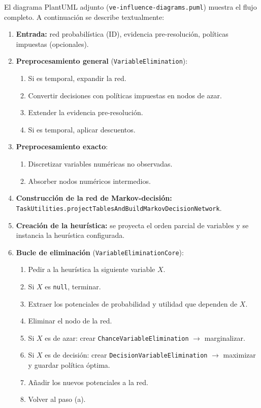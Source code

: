 \documentclass[11pt,a4paper]{article}
\newcommand{\clase}[1]{\texttt{#1}}
\begin{document}
El diagrama PlantUML adjunto (\texttt{ve-influence-diagrams.puml}) muestra
el flujo completo. A continuaci\'{o}n se describe textualmente:

\begin{enumerate}
  \item \textbf{Entrada:} red probabil\'{i}stica (ID), evidencia pre-resoluci\'{o}n,
        pol\'{i}ticas impuestas (opcionales).

  \item \textbf{Preprocesamiento general} (\clase{VariableElimination}):
    \begin{enumerate}
      \item Si es temporal, expandir la red.
      \item Convertir decisiones con pol\'{i}ticas impuestas en nodos de azar.
      \item Extender la evidencia pre-resoluci\'{o}n.
      \item Si es temporal, aplicar descuentos.
    \end{enumerate}

  \item \textbf{Preprocesamiento exacto}:
    \begin{enumerate}
      \item Discretizar variables num\'{e}ricas no observadas.
      \item Absorber nodos num\'{e}ricos intermedios.
    \end{enumerate}

  \item \textbf{Construcci\'{o}n de la red de Markov-decisi\'{o}n:}
        \clase{TaskUtilities.projectTablesAndBuildMarkovDecisionNetwork}.

  \item \textbf{Creaci\'{o}n de la heur\'{i}stica:} se proyecta el orden parcial
        de variables y se instancia la heur\'{i}stica configurada.

  \item \textbf{Bucle de eliminaci\'{o}n} (\clase{VariableEliminationCore}):
    \begin{enumerate}
      \item Pedir a la heur\'{i}stica la siguiente variable $X$.
      \item Si $X$ es \texttt{null}, terminar.
      \item Extraer los potenciales de probabilidad y utilidad que dependen de $X$.
      \item Eliminar el nodo de la red.
      \item Si $X$ es de azar: crear \clase{ChanceVariableElimination}
            $\rightarrow$ marginalizar.
      \item Si $X$ es de decisi\'{o}n: crear \clase{DecisionVariableElimination}
            $\rightarrow$ maximizar y guardar pol\'{i}tica \'{o}ptima.
      \item A\~{n}adir los nuevos potenciales a la red.
      \item Volver al paso (a).
    \end{enumerate}


\end{enumerate}
\end{document}
